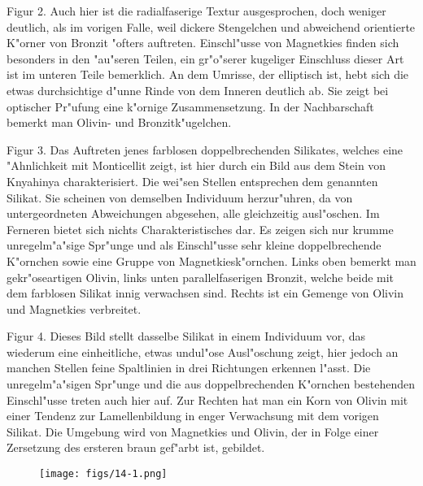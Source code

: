 \documentclass[a4paper, 11pt, oneside, polutonikogreek, german]{article}
\begin{document}
Figur 2. Auch hier ist die radialfaserige Textur ausgesprochen, doch weniger deutlich, als im vorigen Falle, weil dickere Stengelchen und abweichend orientierte K"orner von Bronzit "ofters auftreten. Einschl"usse von Magnetkies finden sich besonders in den "au"seren Teilen, ein gr"o"serer kugeliger Einschluss dieser Art ist im unteren Teile bemerklich. An dem Umrisse, der elliptisch ist, hebt sich die etwas durchsichtige d"unne Rinde von dem Inneren deutlich ab. Sie zeigt bei optischer Pr"ufung eine k"ornige Zusammensetzung. In der Nachbarschaft bemerkt man Olivin- und Bronzitk"ugelchen.

Figur 3. Das Auftreten jenes farblosen doppelbrechenden Silikates, welches eine "Ahnlichkeit mit Monticellit zeigt, ist hier durch ein Bild aus dem Stein von Knyahinya charakterisiert. Die wei"sen Stellen entsprechen dem genannten Silikat. Sie scheinen von demselben Individuum herzur"uhren, da von untergeordneten Abweichungen abgesehen, alle gleichzeitig ausl"oschen. Im Ferneren bietet sich nichts Charakteristisches dar. Es zeigen sich nur krumme unregelm"a"sige Spr"unge und als Einschl"usse sehr kleine doppelbrechende K"ornchen sowie eine Gruppe von Magnetkiesk"ornchen. Links oben bemerkt man gekr"oseartigen Olivin, links unten parallelfaserigen Bronzit, welche beide mit dem farblosen Silikat innig verwachsen sind. Rechts ist ein Gemenge von Olivin und Magnetkies verbreitet.

Figur 4. Dieses Bild stellt dasselbe Silikat in einem Individuum vor, das wiederum eine einheitliche, etwas undul"ose Ausl"oschung zeigt, hier jedoch an manchen Stellen feine Spaltlinien in drei Richtungen erkennen l"asst. Die unregelm"a"sigen Spr"unge und die aus doppelbrechenden K"ornchen bestehenden Einschl"usse treten auch hier auf. Zur Rechten hat man ein Korn von Olivin mit einer Tendenz zur Lamellenbildung in enger Verwachsung mit dem vorigen Silikat. Die Umgebung wird von Magnetkies und Olivin, der in Folge einer Zersetzung des ersteren braun gef"arbt ist, gebildet.
\clearpage

\vspace*{\fill}
\begin{figure}[H]
\centering
\texttt{[image: figs/14-1.png]}
\caption{}
\end{figure}
\vspace*{\fill}
\clearpage
\end{document}

